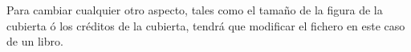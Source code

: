 Para cambiar cualquier otro aspecto, tales como el tamaño de la figura de la cubierta ó los créditos de la cubierta, tendrá que modificar el fichero  en este caso de un libro. 



\endinput
